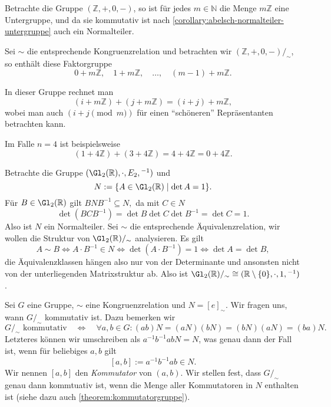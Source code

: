 \begin{example}
    Betrachte die Gruppe $(\mathbb{Z}, +, 0, -)$, so ist für jedes $m \in \mathbb{N}$ die Menge $m \mathbb{Z}$ eine Untergruppe, und da sie kommutativ ist nach \cref{corollary:abelsch-normalteiler-untergruppe} auch ein Normalteiler.

    Sei $\sim$ die entsprechende Kongruenzrelation und betrachten wir $(\mathbb{Z}, +, 0, -)/_\sim$, so enthält diese Faktorgruppe
    $$ 0 + m\mathbb{Z}, \quad 1 + m\mathbb{Z}, \quad \hdots, \quad (m-1) + m\mathbb{Z}. $$

    In dieser Gruppe rechnet man
    $$ (i + m\mathbb{Z}) + (j + m\mathbb{Z}) = (i+j) + m\mathbb{Z}, $$
    wobei man auch $(i + j \pmod{m})$ für einen ``schöneren'' Repräsentanten betrachten kann.

    Im Falle $n = 4$ ist beispielsweise
    $$ (1 + 4\mathbb{Z}) + (3 + 4\mathbb{Z}) = 4 + 4\mathbb{Z} = 0 + 4\mathbb{Z}. $$
\end{example}

\begin{example}
    Betrachte die Gruppe $(\Gl_2(\mathbb{R}), \cdot, E_2, {}^{-1})$ und
    $$ N := \{ A \in \Gl_2(\mathbb{R}) \mid \det A = 1 \}. $$
    Für $B \in \Gl_2(\mathbb{R})$ gilt $ B N B^{-1} \subseteq N, $ da mit $C \in N$
    $$ \det(B C B^{-1}) = \det B \det C \det B^{-1} = \det C = 1. $$
    Also ist $N$ ein Normalteiler. Sei $\sim$ die entsprechende Äquivalenzrelation, wir wollen die Struktur von $\Gl_2(\mathbb{R})/_\sim$ analysieren. Es gilt
    $$ A \sim B \Leftrightarrow A \cdot B^{-1} \in N \Leftrightarrow \det(A \cdot B^{-1}) = 1 \Leftrightarrow \det A = \det B, $$
    die Äquivalenzklassen hängen also nur von der Determinante und ansonsten nicht von der unterliegenden Matrixstruktur ab. Also ist $\Gl_2(\mathbb{R})/_\sim \cong (\mathbb{R} \setminus \{0\}, \cdot, 1, {}^{-1})$.
\end{example}

\begin{remark}
    Sei $G$ eine Gruppe, $\sim$ eine Kongruenzrelation und $N=[e]_\sim$. Wir fragen uns, wann $G/_\sim$ kommutativ ist. Dazu bemerken wir
    $$ G/_\sim \textrm{ kommutativ} \quad \Leftrightarrow \quad \forall a, b \in G: (ab)N = (aN) (bN) = (bN) (aN) = (ba)N. $$
    Letzteres können wir umschreiben als $a^{-1} b^{-1} a b N = N$, was genau dann der Fall ist, wenn für beliebiges $a, b$ gilt
    $$ [a, b] := a^{-1} b^{-1} a b \in N. $$
    Wir nennen $[a, b]$ den \emph{Kommutator}  von $(a, b)$. Wir stellen fest, dass $G/_\sim$ genau dann kommtuativ ist, wenn die Menge aller Kommutatoren in $N$ enthalten ist (siehe dazu auch \cref{theorem:kommutatorgruppe}).
\end{remark}

